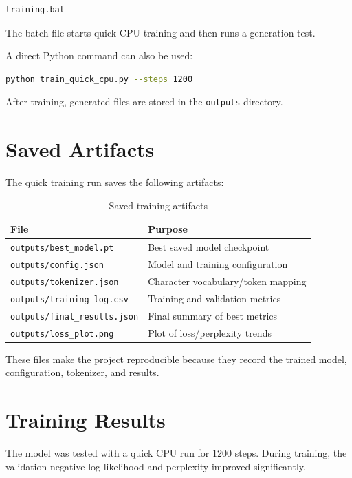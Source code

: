 \documentclass[11pt]{article}
\begin{document}
\begin{lstlisting}[language=bash]
training.bat
\end{lstlisting}

The batch file starts quick CPU training and then runs a generation test.

A direct Python command can also be used:

\begin{lstlisting}[language=bash]
python train_quick_cpu.py --steps 1200
\end{lstlisting}

After training, generated files are stored in the \texttt{outputs} directory.

\section{Saved Artifacts}

The quick training run saves the following artifacts:

\begin{table}[h!]
\centering
\caption{Saved training artifacts}
\begin{tabular}{ll}
\toprule
\textbf{File} & \textbf{Purpose} \\
\midrule
\texttt{outputs/best\_model.pt} & Best saved model checkpoint \\
\texttt{outputs/config.json} & Model and training configuration \\
\texttt{outputs/tokenizer.json} & Character vocabulary/token mapping \\
\texttt{outputs/training\_log.csv} & Training and validation metrics \\
\texttt{outputs/final\_results.json} & Final summary of best metrics \\
\texttt{outputs/loss\_plot.png} & Plot of loss/perplexity trends \\
\bottomrule
\end{tabular}
\end{table}

These files make the project reproducible because they record the trained model, configuration, tokenizer, and results.

\section{Training Results}

The model was tested with a quick CPU run for 1200 steps. During training, the validation negative log-likelihood and perplexity improved significantly.
\end{document}
